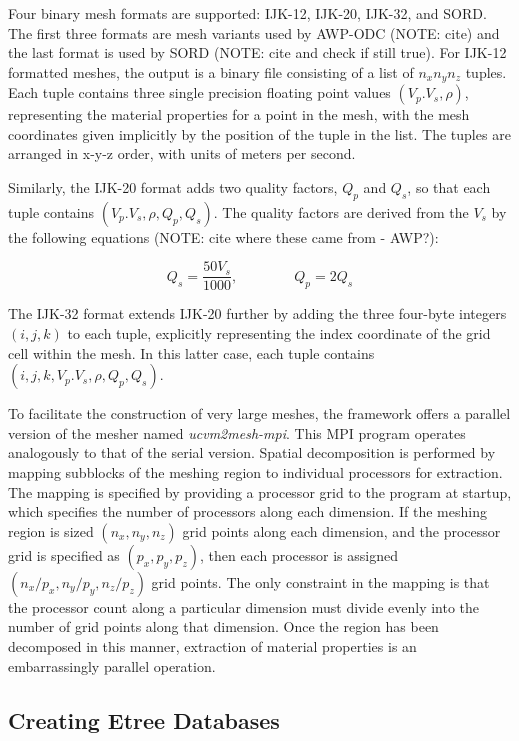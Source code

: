 Four binary mesh formats are supported: IJK-12, IJK-20, IJK-32, and SORD. The first three formats are mesh variants used by AWP-ODC (NOTE: cite) and the last format is used by SORD (NOTE: cite and check if still true). For IJK-12 formatted meshes, the output is a binary file consisting of a list of $n_xn_yn_z$ tuples. Each tuple contains three single precision floating point values $(V_p. V_s, \rho)$, representing the material properties for a point in the mesh, with the mesh coordinates given implicitly by the position of the tuple in the list. The tuples are arranged in x-y-z order, with units of meters per second. 

Similarly, the IJK-20 format adds two quality factors, $Q_p$ and $Q_s$, so that each tuple contains $(V_p. V_s, \rho, Q_p, Q_s)$. The quality factors are derived from the $V_s$ by the following equations (NOTE: cite where these came from - AWP?):

\begin{equation}
Q_s = \frac{50 V_s}{1000}, \qquad \qquad Q_p = 2 Q_s
\end{equation}

The IJK-32 format extends IJK-20 further by adding the three four-byte integers $(i,j,k)$ to each tuple, explicitly representing the index coordinate of the grid cell within the mesh. In this latter case, each tuple contains $(i, j, k, V_p. V_s, \rho, Q_p, Q_s)$.

To facilitate the construction of very large meshes, the framework offers a parallel version of the mesher named \emph{ucvm2mesh-mpi}. This MPI program operates analogously to that of the serial version. Spatial decomposition is performed by mapping subblocks of the meshing region to individual processors for extraction. The mapping is specified by providing a processor grid to the program at startup, which specifies the number of processors along each dimension. If the meshing region is sized $(n_x, n_y, n_z)$ grid points along each dimension, and the processor grid is specified as $(p_x, p_y, p_z)$, then each processor is assigned $(n_x/p_x, n_y/p_y, n_z/p_z)$ grid points. The only constraint in the mapping is that the processor count along a particular dimension must divide evenly into the number of grid points along that dimension. Once the region has been decomposed in this manner, extraction of material properties is an embarrassingly parallel operation.  



\subsection{Creating Etree Databases}

